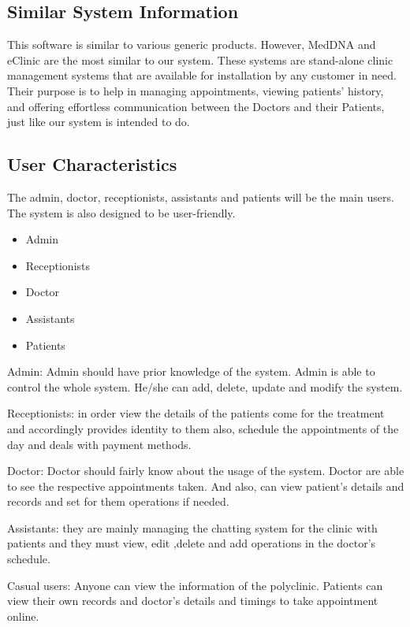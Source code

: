 \documentclass[]{article}
\begin{document}
\subsection{Similar System Information}
This software is similar to various generic products. However, MedDNA and eClinic are the most similar to our system. These systems are stand-alone clinic management systems that are available for installation by any customer in need. Their purpose is to help in managing appointments, viewing patients' history, and offering effortless communication between the Doctors and their Patients, just like our system is intended to do.


\subsection{ User Characteristics}
The admin, doctor, receptionists, assistants and patients will be the main users. The system is also designed to be user-friendly. 

\begin{itemize}
  \item Admin
  \item Receptionists
  \item Doctor
  \item Assistants
  \item Patients
  
  
\end{itemize}

Admin: Admin should have prior knowledge of the system. Admin is able to control the whole system. He/she can add, delete, update and modify the system.


Receptionists: in order view the details of the patients come for the treatment and accordingly provides identity to them also, schedule the appointments of the day and deals with payment methods. 


Doctor: Doctor should fairly know about the usage of the system. Doctor are able to see the respective appointments taken. And also, can view patient’s details and records and set for them operations if needed.


Assistants: they are mainly managing the chatting system for the clinic with patients and they must  view, edit ,delete and add operations in the doctor’s schedule.


Casual users: Anyone can view the information of the polyclinic. Patients can view their own records and doctor’s details and timings to take appointment online.
\end{document}
